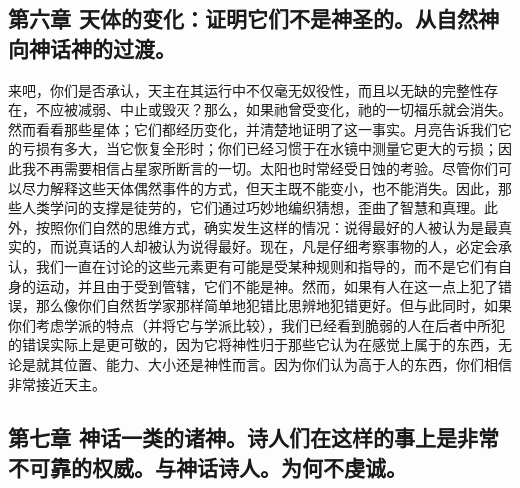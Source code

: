 
\subsection{第六章 天体的变化：证明它们不是神圣的。从自然神向神话神的过渡。}

来吧，你们是否承认，天主在其运行中不仅毫无奴役性，而且以无缺的完整性存在，不应被减弱、中止或毁灭？那么，如果祂曾受变化，祂的一切福乐就会消失。然而看看那些星体；它们都经历变化，并清楚地证明了这一事实。月亮告诉我们它的亏损有多大，当它恢复全形时；你们已经习惯于在水镜中测量它更大的亏损；因此我不再需要相信占星家所断言的一切。太阳也时常经受日蚀的考验。尽管你们可以尽力解释这些天体偶然事件的方式，但天主既不能变小，也不能消失。因此，那些人类学问的支撑是徒劳的，它们通过巧妙地编织猜想，歪曲了智慧和真理。此外，按照你们自然的思维方式，确实发生这样的情况：说得最好的人被认为是最真实的，而说真话的人却被认为说得最好。现在，凡是仔细考察事物的人，必定会承认，我们一直在讨论的这些元素更有可能是受某种规则和指导的，而不是它们有自身的运动，并且由于受到管辖，它们不能是神。然而，如果有人在这一点上犯了错误，那么像你们自然哲学家那样简单地犯错比思辨地犯错更好。但与此同时，如果你们考虑学派的特点（并将它与学派比较），我们已经看到脆弱的人在后者中所犯的错误实际上是更可敬的，因为它将神性归于那些它认为在感觉上属于的东西，无论是就其位置、能力、大小还是神性而言。因为你们认为高于人的东西，你们相信非常接近天主。\par


\subsection{第七章 神话一类的诸神。诗人们在这样的事上是非常不可靠的权威。与神话诗人。为何不虔诚。}

